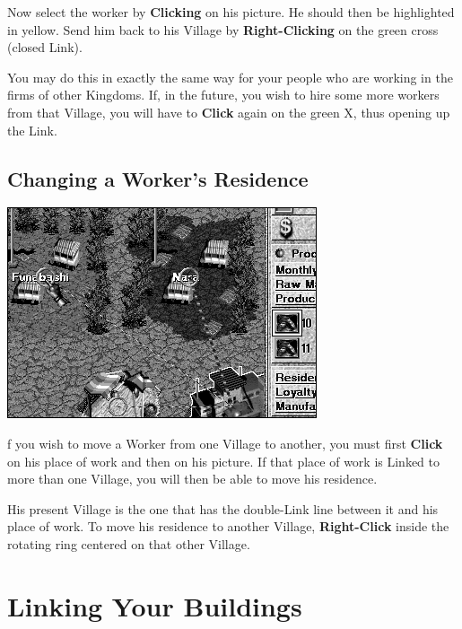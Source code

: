 
Now select the worker by \textbf{Clicking} on his picture. He should then be highlighted in yellow. Send him back to his Village by \textbf{Right-Clicking} on the green cross (closed Link).


You may do this in exactly the same way for your people who are working in the firms of other Kingdoms. If, in the future, you wish to hire some more workers from that Village, you will have to \textbf{Click} again on the green X, thus opening up the Link.

\subsection{\textsf{Changing a Worker’s Residence}}


\begin{center}
    \includegraphics[width=0.6\linewidth]{Iresidencechange} %
\end{center}

f you wish to move a Worker from one Village to another, you must first \textbf{Click} on his place of work and then on his picture. If that place of work is Linked to more than one Village, you will then be able to move his residence.


His present Village is the one that has the double-Link line between it and his place of work. To move his residence to another Village, \textbf{Right-Click} inside the rotating ring centered on that other Village.

\section{\textsf{Linking Your Buildings}}

